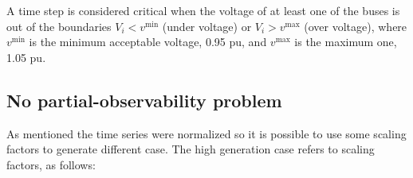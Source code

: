 A time step is considered critical when the voltage of at least one of the buses is out of the boundaries $V_i < v^{\text{min}}$ (under voltage) or $V_i > v^{\text{max}}$ (over voltage), where $v^{\text{min}}$ is the minimum acceptable voltage, 0.95 \gls{pu}, and $v^{\text{max}}$ is the maximum one, 1.05 \gls{pu}.







\subsection{No partial-observability problem}
As mentioned the time series were normalized so it is possible to use some scaling factors to generate different case. The high generation case refers to scaling factors, as follows:
\begin{algorithm}[H]
    
\end{algorithm}

